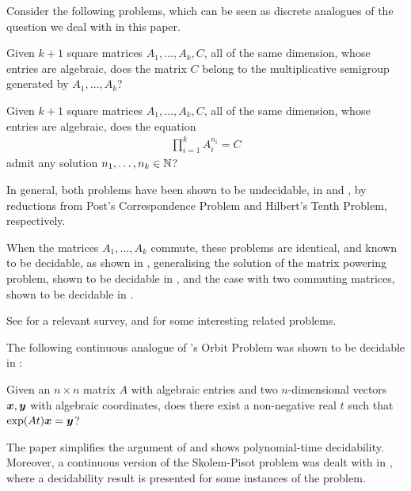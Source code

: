Consider the following problems, which can be seen as discrete analogues of the question we deal with in this paper.

\begin{definition}
Given $k+1$ square matrices $A_{1}, \ldots, A_{k}, C$, all of the same dimension, whose entries are algebraic, does the matrix $C$ belong to the multiplicative semigroup generated by $A_{1}, \ldots, A_{k}$?
\end{definition}

\begin{definition}
Given $k+1$ square matrices $A_{1}, \ldots, A_{k}, C$, all of the same dimension, whose entries are algebraic, does the equation
\begin{align*}
\prod\limits_{i=1}^{k} A_{i}^{n_{i}} = C
\end{align*}
admit any solution $n_{1}, \ldots, n_{k} \in \mathbb{N}$?
\end{definition}

In general, both problems have been shown to be undecidable, in
\cite{Paterson} and \cite{MEHTP}, by reductions from Post's
Correspondence Problem and Hilbert's Tenth Problem, respectively.

When the matrices $A_{1}, \ldots, A_{k}$ commute, these problems are
identical, and known to be decidable, as shown in
\cite{MultiplicativeMatrixEquations}, generalising the solution of the
matrix powering problem, shown to be decidable in \cite{KL86}, and the
case with two commuting matrices, shown to be decidable in \cite{ABC}.

See \cite{HalavaSurvey} for a relevant survey, and \cite{CK05} for
some interesting related problems.

The following continuous analogue of \cite{KL86}'s Orbit Problem was
shown to be decidable in \cite{Hainry08}:

\begin{definition}
Given an $n \times n$ matrix $A$ with algebraic entries and two
$n$-dimensional vectors $\boldsymbol{x}, \boldsymbol{y}$ with
algebraic coordinates, does there exist a non-negative real $t$ such
that $\exp(At) \boldsymbol{x} = \boldsymbol{y}$?
\end{definition}

The paper \cite{ContinuousOrbitIPL} simplifies the argument of
\cite{Hainry08} and shows polynomial-time decidability. Moreover, a
continuous version of the Skolem-Pisot problem was dealt with in
\cite{ContinuousSkolem}, where a decidability result is presented for
some instances of the problem.

